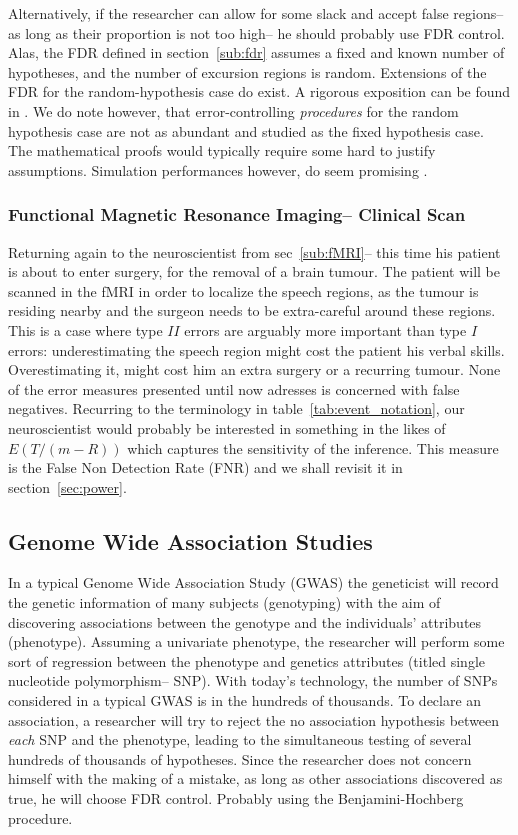 \documentclass[review,12pt]{article}
\begin{document}
Alternatively, if the researcher can allow for some slack and accept false regions-- as long as their proportion is not too high-- he should probably use FDR control. Alas, the FDR defined in section~\ref{sub:fdr} assumes a fixed and known number of hypotheses, and the number of excursion regions is random. Extensions of the FDR for the random-hypothesis case do exist. A rigorous exposition can be found in  \citet{siegmund_false_2011}. We do note however, that error-controlling \emph{procedures} for the random hypothesis case are not as abundant and studied as the fixed hypothesis case. The mathematical proofs would typically require some hard to justify assumptions. Simulation performances however, do seem promising \citep{chumbley_false_2009,chumbley_topological_2010}.


\subsubsection{Functional Magnetic Resonance Imaging-- Clinical Scan}
Returning again to the neuroscientist from sec~\ref{sub:fMRI}-- this time his patient is about to enter surgery, for the removal of a brain tumour. The patient will be scanned in the fMRI in order to localize the speech regions, as the tumour is residing nearby and the surgeon needs to be extra-careful around these regions. This is a case where type $II$ errors are arguably more important than type $I$ errors: underestimating the speech region might cost the patient his verbal skills. Overestimating it, might cost him an extra surgery or a recurring tumour. None of the error measures presented until now adresses is concerned with false negatives. Recurring to the terminology in table~\ref{tab:event_notation}, our neuroscientist would probably be interested in something in the likes of $E(T/(m-R))$ which captures the sensitivity of the inference. This measure is the False Non Detection Rate (FNR) \citep{genovese_ROC_2002} and we shall revisit it in section~\ref{sec:power}. 




\subsection{Genome Wide Association Studies}
In a typical Genome Wide Association Study (GWAS) the geneticist will record the genetic information of many subjects (genotyping) with the aim of discovering associations between the genotype and the individuals' attributes (phenotype). Assuming a univariate phenotype, the researcher will perform some sort of regression between the phenotype and genetics attributes (titled single nucleotide polymorphism-- SNP). With today's technology, the number of SNPs considered in a typical GWAS is in the hundreds of thousands. To declare an association, a researcher will try to reject the no association hypothesis between \emph{each} SNP and the phenotype, leading to the simultaneous testing of several hundreds of thousands of hypotheses. Since the researcher does not concern himself with the making of a mistake, as long as other associations discovered as true, he will choose FDR control. Probably using the Benjamini-Hochberg procedure.
\end{document}
